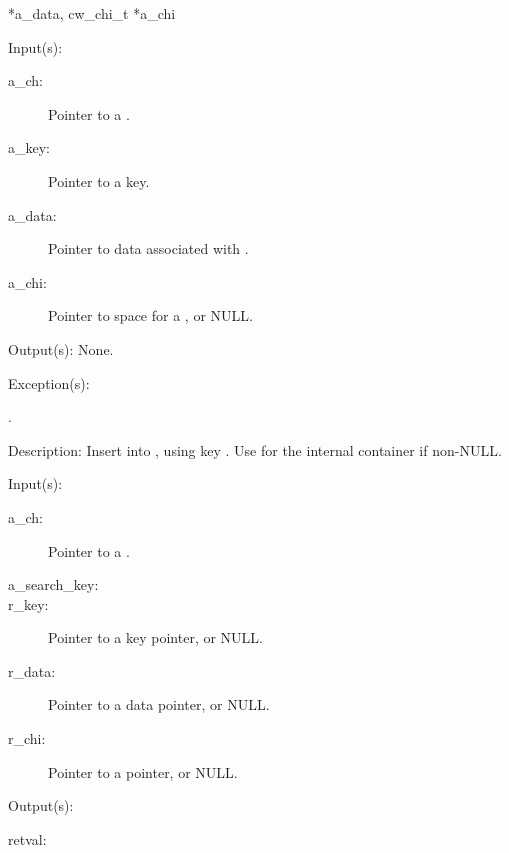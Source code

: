 \begin{capi}
{{*a\_data, cw\_chi\_t *a\_chi}}
	\begin{capilist}
	\item[Input(s): ]
		\begin{description}\item[]
		\item[a\_ch: ]
			Pointer to a .
		\item[a\_key: ]
			Pointer to a key.
		\item[a\_data: ]
			Pointer to data associated with .
		\item[a\_chi: ]
			Pointer to space for a , or NULL.
		\end{description}
	\item[Output(s): ] None.
	\item[Exception(s): ]
		\begin{description}\item[]
		\item[.]
		\end{description}
	\item[Description: ]
		Insert  into , using key
		.  Use  for the internal
		 container if non-NULL.
	\end{capilist}
\label{ch_remove}
	\begin{capilist}
	\item[Input(s): ]
		\begin{description}\item[]
		\item[a\_ch: ]
			Pointer to a \classname{ch}.
		\item[a\_search\_key: ]
		\item[r\_key: ]
			Pointer to a key pointer, or NULL.
		\item[r\_data: ]
			Pointer to a data pointer, or NULL.
		\item[r\_chi: ]
			Pointer to a  pointer, or NULL.
		\end{description}
	\item[Output(s): ]
		\begin{description}\item[]
		\item[retval: ]
			\begin{description}\item[]

\end{description}
\end{description}
\end{capilist}
\end{capi}
